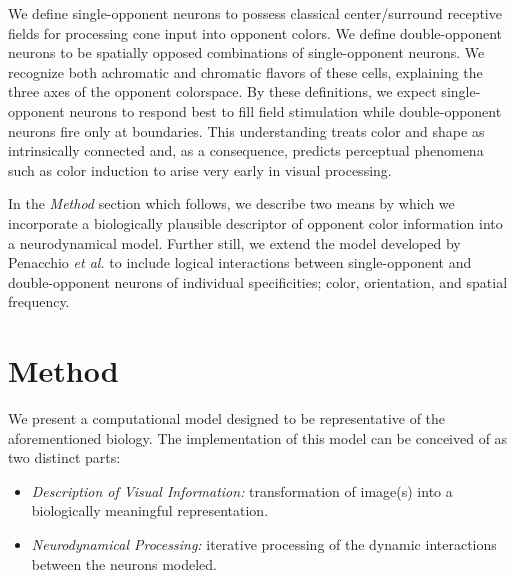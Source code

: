 \documentclass[journal,onecolumn]{IEEEtran}
\begin{document}
We define single-opponent neurons to possess classical center/surround receptive fields for processing cone input into opponent colors. We define double-opponent neurons to be spatially opposed combinations of single-opponent neurons. We recognize both achromatic and chromatic flavors of these cells, explaining the three axes of the opponent colorspace. By these definitions, we expect single-opponent neurons to respond best to fill field stimulation while double-opponent neurons fire only at boundaries. This understanding treats color and shape as intrinsically connected and, as a consequence, predicts perceptual phenomena such as color induction to arise very early in visual processing.

In the \textit{Method} section which follows, we describe two means by which we incorporate a biologically plausible descriptor of opponent color information into a neurodynamical model. Further still, we extend the model developed by Penacchio \textit{et al.} \cite{penacchio:2013} to include logical interactions between single-opponent and double-opponent neurons of individual specificities; color, orientation, and spatial frequency.


%
%
%
\section{Method}

We present a computational model designed to be representative of the aforementioned biology. The implementation of this model can be conceived of as two distinct parts:
\begin{itemize}
    \item \textit{Description of Visual Information:} transformation of image(s) into a biologically meaningful representation.
    \item \textit{Neurodynamical Processing:} iterative processing of the dynamic interactions between the neurons modeled.
\end{itemize}
\end{document}
